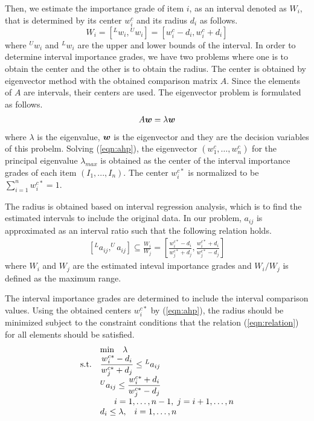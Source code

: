 Then, we estimate the importance grade of item $i$, as an interval denoted as $W_{i}$, that is determined by its center $w{_{i}^c}$ and its radius $d_{i}$ as follows. 
\[
W_{i}=[{^L}w_{i}, {^U}w_{i}]=[w{_{i}^c}-d_{i}, w{_{i}^c}+d_{i}]
\]
where ${^U}w_{i}$ and ${^L}w_{i}$ are the upper and lower bounds of the interval. 
In order to determine interval importance grades, we have two problems where one is to obtain the center and the other is to obtain the radius. 
The center is obtained by eigenvector method with the obtained comparison matrix $A$. 
Since the elements of $A$ are intervals, their centers are used. 
The eigenvector problem is formulated as follows.
\begin{equation}
\begin{array}{l}
A\mbox{\boldmath$w$}=\lambda\mbox{\boldmath$w$}  \\
\end{array}
\label{eqn:ahp}
\end{equation}
where $\lambda$ is the eigenvalue, $\mbox{\boldmath$w$}$ is the eigenvector and they are the decision variables of this probelm. 
Solving (\ref{eqn:ahp}), the eigenvector $(w{_{1}^c, \ldots, w{_{n}^c}})$ for the principal eigenvalue $\lambda_{max}$ is obtained as the center of the interval importance grades of each item $(I_{1},...,I_{n})$. 
The center $w{_{i}^{c*}}$ is normalized to be $\sum_{i=1}^nw{_{i}^{c*}}=1$. 

The radius is obtained based on interval regression analysis, which is to find the estimated intervals to include the original data. 
In our problem, $a_{ij}$ is approximated as an interval ratio such that the following relation holds. 
\begin{equation}
\begin{array}{l}
[^{L}a_{ij},^{U}a_{ij}] \subseteq \frac{W{_{i}}}{W{_{j}}} = \left[ \frac{w{_{i}^{c*}}-d_{i}}{w{_{j}^{c*}}+d_{j}},\frac{w{_{i}^{c*}}+d_{i}}{w{_{j}^{c*}}-d_{j}}\right]
\end{array}
\label{eqn:relation}
\end{equation}
where $W_i$ and $W_j$ are the estimated inteval importance grades and $W{_{i}}/W{_{j}}$ is defined as the maximum range. 

The interval importance grades are determined to include the interval comparison values. 
Using the obtained centers $w{_{i}^{c*}}$ by (\ref{eqn:ahp}), the radius should be minimized subject to the constraint conditions that the relation (\ref{eqn:relation}) for all elements should be satisfied. 
\begin{equation}
\begin{array}{ll}
& \min  \;\;\; \lambda \\
{\rm{s.t.}} & {\displaystyle \frac{w{_{i}^{c*}}-d_{i}}{w{_{j}^{c*}}+d_{j}}}\leq {^{L}a_{ij}} \\
& {^{U}a_{ij}} \leq {\displaystyle \frac{w{_{i}^{c*}}+d_{i}}{w{_{j}^{c*}}-d_{j}}} \\
& \;\;\; \;\;\; i=1,\ldots,n-1,\;j=i+1,\ldots,n \\
& d_{i} \leq \lambda,\;\;\; i=1,\ldots,n \\
\end{array}
\label{eqn:radius}
\end{equation} 

